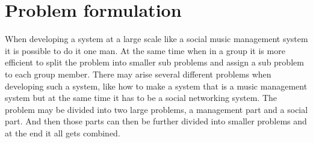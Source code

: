 \section{Problem formulation}
When developing a system at a large scale like a social music management system it is possible to do it one man. At the same time when in a group it is more efficient to split the problem into smaller sub problems and assign a sub problem to each group member. There may arise several different problems when developing such a system, like how to make a system that is a music management system but at the same time it has to be a social networking system. The problem may be divided into two large problems, a management part and a social part. And then those parts can then be further divided into smaller problems and at the end it all gets combined.

